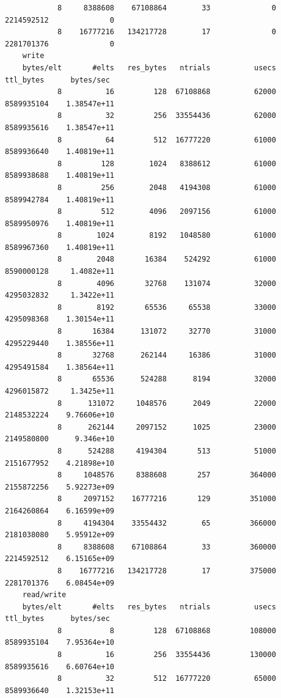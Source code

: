 \documentclass[]{article}
\begin{document}
\begin{lstlisting}
            8     8388608    67108864        33              0     2214592512              0
            8    16777216   134217728        17              0     2281701376              0
    write       
    bytes/elt       #elts   res_bytes   ntrials          usecs      ttl_bytes      bytes/sec
            8          16         128  67108868          62000     8589935104    1.38547e+11
            8          32         256  33554436          62000     8589935616    1.38547e+11
            8          64         512  16777220          61000     8589936640    1.40819e+11
            8         128        1024   8388612          61000     8589938688    1.40819e+11
            8         256        2048   4194308          61000     8589942784    1.40819e+11
            8         512        4096   2097156          61000     8589950976    1.40819e+11
            8        1024        8192   1048580          61000     8589967360    1.40819e+11
            8        2048       16384    524292          61000     8590000128     1.4082e+11
            8        4096       32768    131074          32000     4295032832     1.3422e+11
            8        8192       65536     65538          33000     4295098368    1.30154e+11
            8       16384      131072     32770          31000     4295229440    1.38556e+11
            8       32768      262144     16386          31000     4295491584    1.38564e+11
            8       65536      524288      8194          32000     4296015872     1.3425e+11
            8      131072     1048576      2049          22000     2148532224    9.76606e+10
            8      262144     2097152      1025          23000     2149580800      9.346e+10
            8      524288     4194304       513          51000     2151677952    4.21898e+10
            8     1048576     8388608       257         364000     2155872256    5.92273e+09
            8     2097152    16777216       129         351000     2164260864    6.16599e+09
            8     4194304    33554432        65         366000     2181038080    5.95912e+09
            8     8388608    67108864        33         360000     2214592512    6.15165e+09
            8    16777216   134217728        17         375000     2281701376    6.08454e+09
    read/write
    bytes/elt       #elts   res_bytes   ntrials          usecs      ttl_bytes      bytes/sec
            8           8         128  67108868         108000     8589935104    7.95364e+10
            8          16         256  33554436         130000     8589935616    6.60764e+10
            8          32         512  16777220          65000     8589936640    1.32153e+11

\end{lstlisting}
\end{document}
